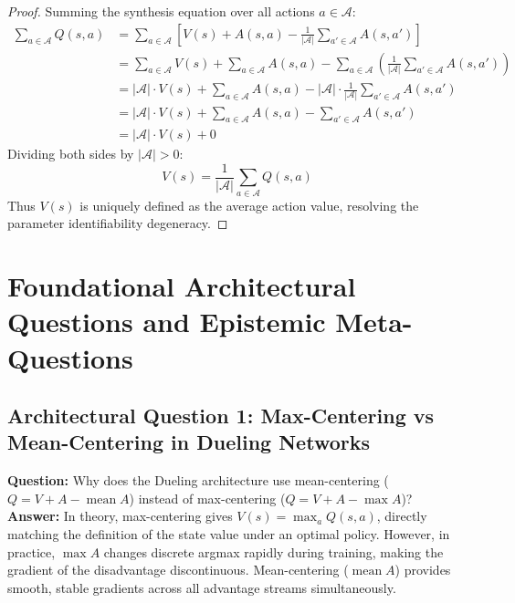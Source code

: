\documentclass[11pt,a4paper]{article}
\theoremstyle{definition}
\begin{document}
\begin{proof}
Summing the synthesis equation over all actions $a \in \mathcal{A}$:
{\boldmath
\begin{align}
\sum_{a \in \mathcal{A}} Q(s, a) &= \sum_{a \in \mathcal{A}} \left[ V(s) + A(s, a) - \frac{1}{|\mathcal{A}|} \sum_{a' \in \mathcal{A}} A(s, a') \right] \\
&= \sum_{a \in \mathcal{A}} V(s) + \sum_{a \in \mathcal{A}} A(s, a) - \sum_{a \in \mathcal{A}} \left( \frac{1}{|\mathcal{A}|} \sum_{a' \in \mathcal{A}} A(s, a') \right) \\
&= |\mathcal{A}| \cdot V(s) + \sum_{a \in \mathcal{A}} A(s, a) - |\mathcal{A}| \cdot \frac{1}{|\mathcal{A}|} \sum_{a' \in \mathcal{A}} A(s, a') \\
&= |\mathcal{A}| \cdot V(s) + \sum_{a \in \mathcal{A}} A(s, a) - \sum_{a' \in \mathcal{A}} A(s, a') \\
&= |\mathcal{A}| \cdot V(s) + 0
\end{align}
}
Dividing both sides by $|\mathcal{A}| > 0$:
{\boldmath
\begin{equation}
V(s) = \frac{1}{|\mathcal{A}|} \sum_{a \in \mathcal{A}} Q(s, a)
\end{equation}
}
Thus $V(s)$ is uniquely defined as the average action value, resolving the parameter identifiability degeneracy.
\end{proof}

\section{Foundational Architectural Questions and Epistemic Meta-Questions}

\subsection{Architectural Question 1: Max-Centering vs Mean-Centering in Dueling Networks}
\textbf{Question:} Why does the Dueling architecture use mean-centering ($Q = V + A - \operatorname{mean} A$) instead of max-centering ($Q = V + A - \max A$)?\\
\textbf{Answer:} In theory, max-centering gives $V(s) = \max_a Q(s, a)$, directly matching the definition of the state value under an optimal policy. However, in practice, $\max A$ changes discrete argmax rapidly during training, making the gradient of the disadvantage discontinuous. Mean-centering ($\operatorname{mean} A$) provides smooth, stable gradients across all advantage streams simultaneously.
\end{document}
